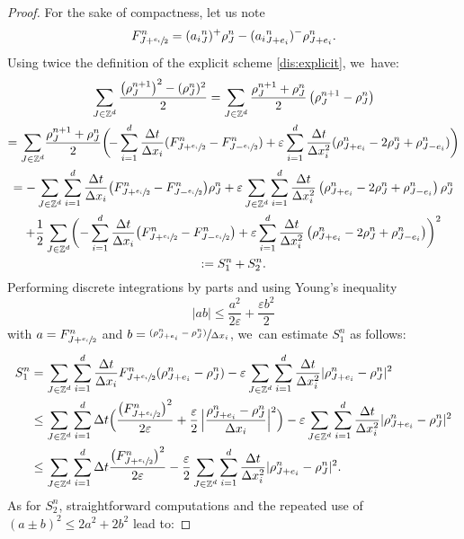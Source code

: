 \documentclass[JEP,XML,SOM,Unicode, NoFloatCountersInSection,published]{cedram}
\newcommand{\psfrac}[2]{\sfrac{(#1)}{#2}}
\def\ZZ{\mathbb{Z}}
\def\eps{\varepsilon}
\def\dt{\Delta t}
\def\dx{\Delta x}
\theoremstyle{plain}
\theoremstyle{definition}
\begin{document}
\begin{proof}
For the sake of compactness, let us note
\[
F_{J+ \sfrac{e_i}{2}}^n = ({a_i}^n_{J})^+ \rho_{J}^n - ({a_i}^n_{J+e_i})^- \rho_{J+e_i}^n.
\]
Using twice the definition of the explicit scheme \eqref{dis:explicit}, we~have:
\begin{multline*}
\sum_{J \in \ZZ^d} \frac{\big(\rho_J^{n+1}\big)^2 -(\rho_J^n)^2}{2} = \sum_{J \in \ZZ^d} \frac{\rho_J^{n+1}+ \rho_J^n}{2} \left(\rho_J^{n+1}-\rho_J^n\right) \\
= \sum_{J \in \ZZ^d}\! \frac{\rho_J^{n+1} + \rho_J^n}{2} \biggl(\!- \sum_{i=1}^{d} \frac{\dt}{\dx_i}
(F_{J+ \sfrac{e_i}{2}}^n - F_{J- \sfrac{e_i}{2}}^n)+ \eps \sum_{i=1}^{d} \frac{\dt}{\dx_i^2}(\rho_{J+e_i}^n - 2\rho_J^n + \rho_{J-e_i}^n)\biggr) \\
= - \sum_{J \in \ZZ^d} \sum_{i=1}^{d} \frac{\dt}{\dx_i}
\big(F_{J+ \sfrac{e_i}{2}}^n - F_{J- \sfrac{e_i}{2}}^n \big) \rho_J^n + \eps \sum_{J \in \ZZ^d} \sum_{i=1}^{d} \frac{\dt}{\dx_i^2} \left(\rho_{J+e_i}^n - 2\rho_J^n + \rho_{J-e_i}^n \right)\rho_J^n \\
+ \frac 12 \sum_{J \in \ZZ^d} \biggl(- \sum_{i=1}^{d} \frac{\dt}{\dx_i}
\big(F_{J+ \sfrac{e_i}{2}}^n - F_{J- \sfrac{e_i}{2}}^n \big) + \eps \sum_{i=1}^{d} \frac{\dt}{\dx_i^2} \left(\rho_{J+e_i}^n - 2\rho_J^n + \rho_{J-e_i}^n \right)\biggr)^2\\
:= S_1^n + S_2^n.
\end{multline*}
Performing discrete integrations by parts and using Young's inequality
\[
|ab| \leq \frac{a^2}{2\eps} + \frac{\eps b^2}{2}
\]
with $a=F_{J+ \sfrac{e_i}{2}}^n$ and $b=\psfrac{\rho_{J+e_i}^n - \rho_J^n}{\dx_i}$, we~can estimate $S_1^n$ as follows:
\begin{align*}
S_1^n & = \sum_{J \in \ZZ^d} \sum_{i=1}^{d} \frac{\dt}{\dx_i}
F_{J+ \sfrac{e_i}{2}}^n(\rho_{J+e_i}^n - \rho_J^n) - \eps \sum_{J \in \ZZ^d} \sum_{i=1}^{d} \frac{\dt}{\dx_i^2} |\rho_{J+e_i}^n - \rho_J^n|^2 \\
& \leq \sum_{J \in \ZZ^d} \sum_{i=1}^{d} \dt \Bigl(
\frac{\big(F_{J+ \sfrac{e_i}{2}}^n\big)^2}{2\eps} + \frac{\eps}{2}\,\Bigl|\frac{\rho_{J+e_i}^n - \rho_J^n}{\dx_i}\Bigr|^2 \Bigr) - \eps \sum_{J \in \ZZ^d} \sum_{i=1}^{d} \frac{\dt}{\dx_i^2} |\rho_{J+e_i}^n - \rho_J^n|^2 \\
& \leq \sum_{J \in \ZZ^d} \sum_{i=1}^{d} \dt
\frac{\big(F_{J+ \sfrac{e_i}{2}}^n\big)^2}{2\eps} - \frac{\eps}{2} \sum_{J \in \ZZ^d} \sum_{i=1}^{d} \frac{\dt}{\dx_i^2} |\rho_{J+e_i}^n - \rho_J^n|^2.
\end{align*}
As for $S_2^n$, straightforward computations and the repeated use of $(a\pm b)^2 \leq 2a^2+2b^2$ lead to:

\end{proof}
\end{document}
